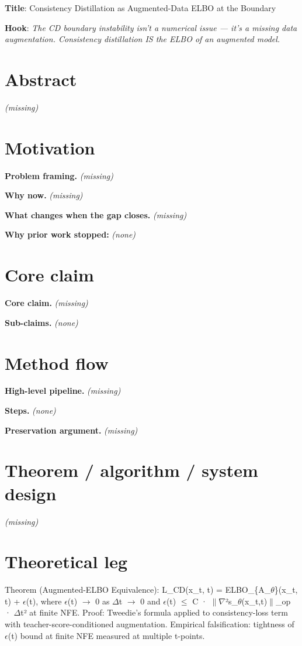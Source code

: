 \documentclass[10pt,a4paper]{article}
\begin{document}
\begin{tcolorbox}[colback=bgskill, colframe=cblue, title=\textbf{NoveltySkill — Idea Card (L3 Oral-Ready)}, breakable]

\textbf{Title}: Consistency Distillation as Augmented-Data ELBO at the Boundary

\textbf{Hook}: \emph{ The CD boundary instability isn't a numerical issue --- it's a missing data augmentation. Consistency distillation IS the ELBO of an augmented model. }

\section*{Abstract}
\emph{(missing)}

\section*{Motivation}
\textbf{Problem framing.} \emph{(missing)}

\textbf{Why now.} \emph{(missing)}

\textbf{What changes when the gap closes.} \emph{(missing)}

\textbf{Why prior work stopped:}
\emph{(none)}

\section*{Core claim}
\textbf{Core claim.} \emph{(missing)}

\textbf{Sub-claims.}
\emph{(none)}

\section*{Method flow}
\textbf{High-level pipeline.} \emph{(missing)}

\textbf{Steps.}
\emph{(none)}

\textbf{Preservation argument.} \emph{(missing)}

\section*{Theorem / algorithm / system design}
\emph{(missing)}

\section*{Theoretical leg}
Theorem (Augmented-ELBO Equivalence): L\_CD(x\_t, t) = ELBO\_\{A\_$\theta$\}(x\_t, t) + $\epsilon$(t), where $\epsilon$(t) $\to$ 0 as $\Delta$t $\to$ 0 and $\epsilon$(t) $\le$ C · $\|$$\nabla$²s\_$\theta$(x\_t,t)$\|$\_op · $\Delta$t² at finite NFE. Proof: Tweedie's formula applied to consistency-loss term with teacher-score-conditioned augmentation. Empirical falsification: tightness of $\epsilon$(t) bound at finite NFE measured at multiple t-points.


\end{tcolorbox}
\end{document}
